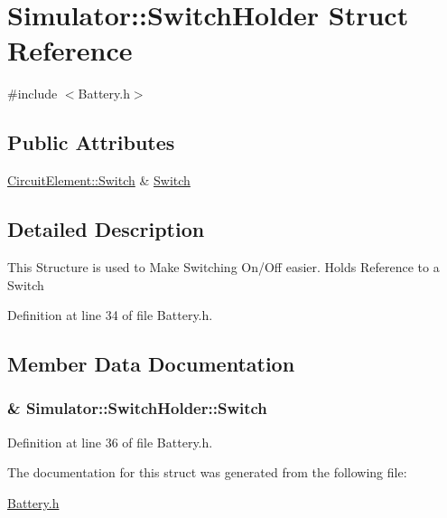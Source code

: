 \hypertarget{struct_simulator_1_1_switch_holder}{}\section{Simulator\+:\+:Switch\+Holder Struct Reference}
\label{struct_simulator_1_1_switch_holder}


{\ttfamily \#include $<$Battery.\+h$>$}

\subsection*{Public Attributes}
\begin{DoxyCompactItemize}
\item 
\hyperlink{struct_simulator_1_1_circuit_element_1_1_switch}{Circuit\+Element\+::\+Switch} \& \hyperlink{struct_simulator_1_1_switch_holder_a917009d1cfb781aa34673a498948879e}{Switch}
\end{DoxyCompactItemize}


\subsection{Detailed Description}
This Structure is used to Make Switching On/\+Off easier. Holds Reference to a Switch 

Definition at line 34 of file Battery.\+h.



\subsection{Member Data Documentation}
\hypertarget{struct_simulator_1_1_switch_holder_a917009d1cfb781aa34673a498948879e}{}
\subsubsection[{Switch}]{\& Simulator\+::\+Switch\+Holder\+::\+Switch}\label{struct_simulator_1_1_switch_holder_a917009d1cfb781aa34673a498948879e}


Definition at line 36 of file Battery.\+h.



The documentation for this struct was generated from the following file\+:\begin{DoxyCompactItemize}
\item 
\hyperlink{_battery_8h}{Battery.\+h}\end{DoxyCompactItemize}
